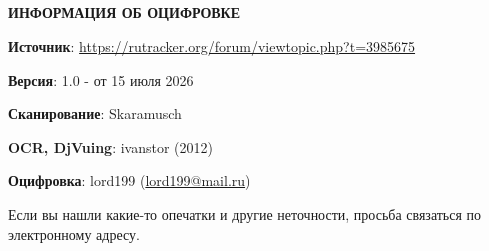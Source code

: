 \documentclass[12pt, a4paper, openany]{book}
\begin{document}
\setcounter{secnumdepth}{0}  


\ \\
\ \\
\ \\
\ \\

\hangindent=2cm   	\textbf{ИНФОРМАЦИЯ ОБ ОЦИФРОВКЕ}

\hangindent=2cm   	\textbf{Источник}:  \href{https://rutracker.org/forum/viewtopic.php?t=3985675}{https://rutracker.org/forum/viewtopic.php?t=3985675} 

\hangindent=2cm   	\textbf{Версия}: 1.0 - от 15 июля 2026

\hangindent=2cm   	\textbf{Сканирование}: Skaramusch

\hangindent=2cm   	\textbf{OCR, DjVuing}: ivanstor (2012)

\hangindent=2cm   	\textbf{Оцифровка}: lord199 (\href{mailto:lord199@mail.ru}{lord199@mail.ru})



\hangindent=2cm   Если вы нашли какие-то опечатки и другие неточности, просьба связаться по электронному адресу.




\thispagestyle{empty} %
\end{document}
